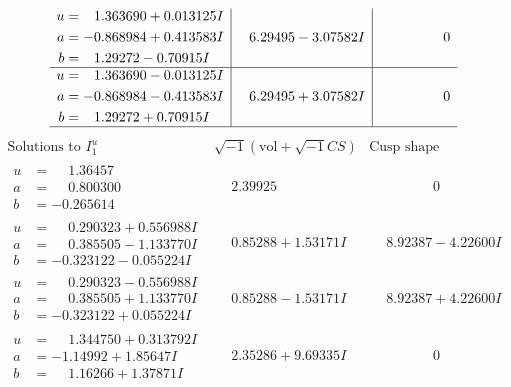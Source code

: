 \documentclass[1p]{elsarticle_modified}
\theoremstyle{definition}
\newcommand{\I}{\sqrt{-1}}
\begin{document}
$$\begin{array}{c|c|c}
\begin{aligned}
u &= \phantom{-}1.363690 + 0.013125 I \\
a &= -0.868984 + 0.413583 I \\
b &= \phantom{-}1.29272 - 0.70915 I\end{aligned}
 & \phantom{-}6.29495 - 3.07582 I & \phantom{-0.000000 } 0 \\ \hline\begin{aligned}
u &= \phantom{-}1.363690 - 0.013125 I \\
a &= -0.868984 - 0.413583 I \\
b &= \phantom{-}1.29272 + 0.70915 I\end{aligned}
 & \phantom{-}6.29495 + 3.07582 I & \phantom{-0.000000 } 0\\
 \hline 
 \end{array}$$\newpage$$\begin{array}{c|c|c}  
\text{Solutions to }I^u_{1}& \I (\text{vol} + \sqrt{-1}CS) & \text{Cusp shape}\\
 \hline 
\begin{aligned}
u &= \phantom{-}1.36457\phantom{ +0.000000I} \\
a &= \phantom{-}0.800300\phantom{ +0.000000I} \\
b &= -0.265614\phantom{ +0.000000I}\end{aligned}
 & \phantom{-}2.39925\phantom{ +0.000000I} & \phantom{-0.000000 } 0 \\ \hline\begin{aligned}
u &= \phantom{-}0.290323 + 0.556988 I \\
a &= \phantom{-}0.385505 - 1.133770 I \\
b &= -0.323122 - 0.055224 I\end{aligned}
 & \phantom{-}0.85288 + 1.53171 I & \phantom{-}8.92387 - 4.22600 I \\ \hline\begin{aligned}
u &= \phantom{-}0.290323 - 0.556988 I \\
a &= \phantom{-}0.385505 + 1.133770 I \\
b &= -0.323122 + 0.055224 I\end{aligned}
 & \phantom{-}0.85288 - 1.53171 I & \phantom{-}8.92387 + 4.22600 I \\ \hline\begin{aligned}
u &= \phantom{-}1.344750 + 0.313792 I \\
a &= -1.14992 + 1.85647 I \\
b &= \phantom{-}1.16266 + 1.37871 I\end{aligned}
 & \phantom{-}2.35286 + 9.69335 I & \phantom{-0.000000 } 0 \\ \hline\begin{aligned}

\end{aligned}
\end{array}$$
\end{document}
